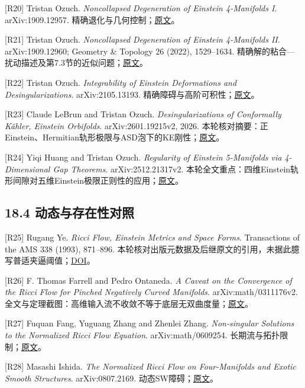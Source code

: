 \documentclass[
  11pt,
  a4paper,
  fontset=none]{ctexart}
\begin{document}
{[}R20{]} Tristan Ozuch. \emph{Noncollapsed Degeneration of Einstein
4-Manifolds I}. arXiv:1909.12957.
精确退化与几何控制；\href{https://arxiv.org/abs/1909.12957}{原文}。

{[}R21{]} Tristan Ozuch. \emph{Noncollapsed Degeneration of Einstein
4-Manifolds II}. arXiv:1909.12960; Geometry \& Topology 26 (2022),
1529--1634.
精确解的粘合---扰动描述及第7.3节的近似问题；\href{https://arxiv.org/abs/1909.12960}{原文}。

{[}R22{]} Tristan Ozuch. \emph{Integrability of Einstein Deformations
and Desingularizations}. arXiv:2105.13193.
精确障碍与高阶可积性；\href{https://arxiv.org/abs/2105.13193}{原文}。

{[}R23{]} Claude LeBrun and Tristan Ozuch. \emph{Desingularizations of
Conformally Kähler, Einstein Orbifolds}. arXiv:2601.19215v2, 2026.
本轮核对摘要：正Einstein、Hermitian轨形极限与ASD泡下的KE刚性；\href{https://arxiv.org/abs/2601.19215}{原文}。

{[}R24{]} Yiqi Huang and Tristan Ozuch. \emph{Regularity of Einstein
5-Manifolds via 4-Dimensional Gap Theorems}. arXiv:2512.21317v2.
本轮全文重点：四维Einstein轨形间隙对五维Einstein极限正则性的应用；\href{https://arxiv.org/abs/2512.21317}{原文}。

\subsection{18.4
动态与存在性对照}\label{ux52a8ux6001ux4e0eux5b58ux5728ux6027ux5bf9ux7167}

{[}R25{]} Rugang Ye. \emph{Ricci Flow, Einstein Metrics and Space
Forms}. Transactions of the AMS 338 (1993), 871--896.
本轮核对出版元数据及后继原文的引用，未据此臆写普适夹逼阈值；\href{https://doi.org/10.1090/S0002-9947-1993-1108615-3}{DOI}。

{[}R26{]} F. Thomas Farrell and Pedro Ontaneda. \emph{A Caveat on the
Convergence of the Ricci Flow for Pinched Negatively Curved Manifolds}.
arXiv:math/0311176v2.
全文与定理截图：高维输入流不收敛不等于底层无双曲度量；\href{https://arxiv.org/abs/math/0311176}{原文}。

{[}R27{]} Fuquan Fang, Yuguang Zhang and Zhenlei Zhang.
\emph{Non-singular Solutions to the Normalized Ricci Flow Equation}.
arXiv:math/0609254.
长期流与拓扑限制；\href{https://arxiv.org/abs/math/0609254}{原文}。

{[}R28{]} Masashi Ishida. \emph{The Normalized Ricci Flow on
Four-Manifolds and Exotic Smooth Structures}. arXiv:0807.2169.
动态SW障碍；\href{https://arxiv.org/abs/0807.2169}{原文}。
\end{document}
